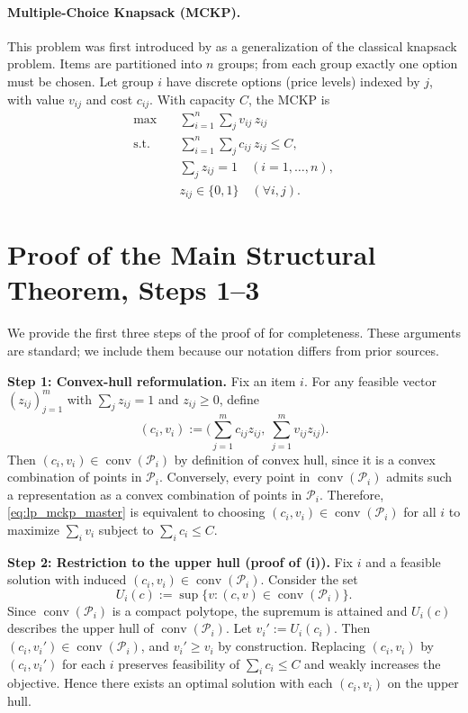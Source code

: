 \documentclass[11pt, a4paper]{article}
\theoremstyle{plain}
\theoremstyle{definition}
\theoremstyle{remark}
\begin{document}
\paragraph{Multiple-Choice Knapsack (MCKP).}
This problem was first introduced by \citet{Nauss1978} as a generalization of the classical knapsack problem. Items are partitioned into $n$ groups; from each group exactly one option must be chosen.
Let group $i$ have discrete options (price levels) indexed by $j$, with value $v_{ij}$ and cost $c_{ij}$. With capacity $C$, the MCKP is
\begin{align}
    \max \quad & \sum_{i=1}^n \sum_j v_{ij}\,z_{ij} \label{eq:mckp_obj}\\
    \text{s.t.}\quad & \sum_{i=1}^n \sum_j c_{ij}\,z_{ij} \le C, \label{eq:mckp_cap}\\
    & \sum_j z_{ij}=1 \quad (i=1,\dots,n), \label{eq:mckp_choice}\\
    & z_{ij}\in\{0,1\}\quad (\forall i,j). \label{eq:mckp_bin}
\end{align}




\section{Proof of the Main Structural Theorem, Steps 1--3}\label{app:thm2_steps}
We provide the first three steps of the proof of  for completeness. These arguments are standard; we include them because our notation differs from prior sources.

\textbf{Step 1: Convex-hull reformulation.}
Fix an item $i$. For any feasible vector $(z_{ij})_{j=1}^m$ with $\sum_j z_{ij}=1$ and $z_{ij}\ge 0$, define
\[
(c_i,v_i):=\Big(\sum_{j=1}^m c_{ij}z_{ij},\ \sum_{j=1}^m v_{ij}z_{ij}\Big).
\]
Then $(c_i,v_i)\in \operatorname{conv}(\mathcal P_i)$ by definition of convex hull, since it is a convex combination of points in $\mathcal P_i$.
Conversely, every point in $\operatorname{conv}(\mathcal P_i)$ admits such a representation as a convex combination of points in $\mathcal P_i$.
Therefore, \eqref{eq:lp_mckp_master} is equivalent to choosing $(c_i,v_i)\in \operatorname{conv}(\mathcal P_i)$ for all $i$ to maximize
$\sum_i v_i$ subject to $\sum_i c_i\le C$.

\textbf{Step 2: Restriction to the upper hull (proof of (i)).}
Fix $i$ and a feasible solution with induced $(c_i,v_i)\in\operatorname{conv}(\mathcal P_i)$.
Consider the set
\[
U_i(c):=\sup\{v : (c,v)\in\operatorname{conv}(\mathcal P_i)\}.
\]
Since $\operatorname{conv}(\mathcal P_i)$ is a compact polytope, the supremum is attained and $U_i(c)$ describes the upper hull
of $\operatorname{conv}(\mathcal P_i)$.
Let $v_i':=U_i(c_i)$. Then $(c_i,v_i')\in\operatorname{conv}(\mathcal P_i)$, and $v_i'\ge v_i$ by construction.
Replacing $(c_i,v_i)$ by $(c_i,v_i')$ for each $i$ preserves feasibility of $\sum_i c_i\le C$ and weakly increases the objective.
Hence there exists an optimal solution with each $(c_i,v_i)$ on the upper hull.
\end{document}
